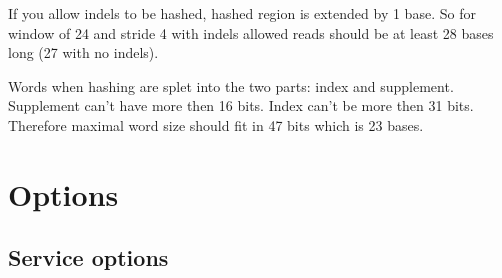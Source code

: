 \documentclass[english,letter]{article}
\begin{document}
    If you allow indels to be hashed, hashed region is extended by 1 base. So 
    for window of 24 and stride 4 with indels allowed reads should be at least
    28 bases long (27 with no indels).

    Words when hashing are splet into the two parts: index and supplement. 
    Supplement can't have more then 16 bits. Index can't be more then 31 bits.
    Therefore maximal word size should fit in 47 bits which is 23 bases.


\section{Options}\label{secOptions}

\subsection{Service options}
\end{document}
